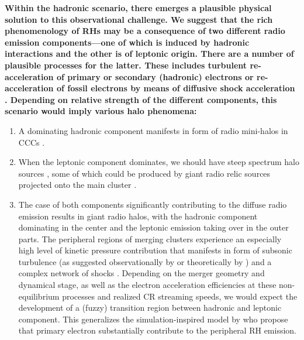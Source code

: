 \documentclass[useAMS,usenatbib]{mn2e}
\begin{document}
{\bf Within the hadronic scenario, there emerges a plausible physical solution to
this observational challenge. We suggest that the rich phenomenology of RHs may be a
consequence of two different radio emission components---one of which is induced
by hadronic interactions and the other is of leptonic origin. 
There are a number of plausible processes for the latter.     
These includes turbulent re-acceleration of primary or secondary (hadronic)
electrons \citep{2010arXiv1008.0184B} or re-acceleration of fossil electrons by
means of diffusive shock acceleration \citep{kang11,kang12,pinzke13}.
Depending on relative strength of the different components, this scenario would imply 
various halo phenomena:}
\begin{enumerate}
\item A dominating hadronic component  manifests in form of radio mini-halos in
  CCCs \citep{2004A&A...413...17P}.
\item When the leptonic component dominates, we should have steep spectrum halo
  sources \citep[such as A520,][]{2008Natur.455..944B}, some of which could be
  produced by giant radio relic sources projected onto the main cluster
  \citep{2012arXiv1211.3122S}.
\item The case of both components significantly contributing to the diffuse
  radio emission results in giant radio halos, with the hadronic component
  dominating in the center and the leptonic emission taking over in the outer
  parts. The peripheral regions of merging clusters experience an especially
  high level of kinetic pressure contribution \citep{2009ApJ...705.1129L,
    2012ApJ...758...74B} that manifests in form of subsonic turbulence (as
  suggested observationally by \citealp{2004A&A...426..387S} or theoretically by
  \citealp{2006MNRAS.366.1437S,2005MNRAS.364..753D, 2008Sci...320..909R}) and a
  complex network of shocks \citep{2003ApJ...593..599R, 2006MNRAS.367..113P,
    2008MNRAS.385.1211P, 2008ApJ...689.1063S, 2009MNRAS.395.1333V}. Depending on
  the merger geometry and dynamical stage, as well as the electron acceleration
  efficiencies at these non-equilibrium processes and realized CR streaming
  speeds, we would expect the development of a (fuzzy) transition region between
  hadronic and leptonic component. This generalizes the simulation-inspired
  model by \cite{2008MNRAS.385.1211P} who propose that primary electron
  substantially contribute to the peripheral RH emission.
\end{enumerate}
\end{document}
